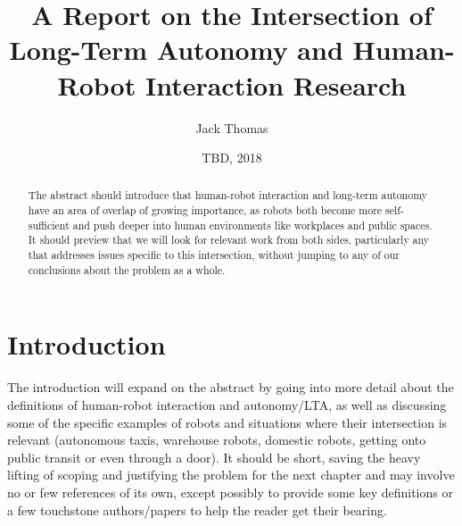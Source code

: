 \documentclass{sfuthesis}
\title{A Report on the Intersection of Long-Term Autonomy and Human-Robot Interaction Research}
\author{Jack Thomas}
\date{TBD, 2018}
\begin{document}
\frontmatter
\maketitle{}
\makecommittee{}


\begin{abstract}
The abstract should introduce that human-robot interaction and long-term autonomy have an area of overlap of growing importance, as robots both become more self-sufficient and push deeper into human environments like workplaces and public spaces. It should preview that we will look for relevant work from both sides, particularly any that addresses issues specific to this intersection, without jumping to any of our conclusions about the problem as a whole.
\end{abstract}





%
\tableofcontents%
\clearpage

%
\listoftables%
\clearpage

%
\listoffigures%
\clearpage





%
%

\mainmatter%

\chapter{Introduction}

The introduction will expand on the abstract by going into more detail about the definitions of human-robot interaction and autonomy/LTA, as well as discussing some of the specific examples of robots and situations where their intersection is relevant (autonomous taxis, warehouse robots, domestic robots, getting onto public transit or even through a door). It should be short, saving the heavy lifting of scoping and justifying the problem for the next chapter and may involve no or few references of its own, except possibly to provide some key definitions or a few touchstone authors/papers to help the reader get their bearing.
\end{document}
